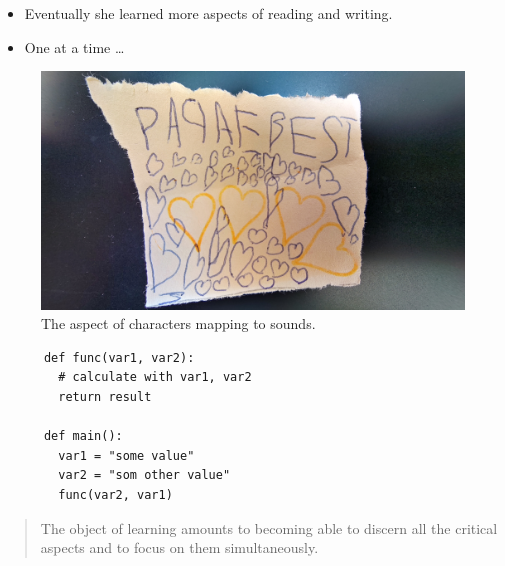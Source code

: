 \begin{frame}
  \begin{remark}
    \begin{itemize}
      \item Eventually she learned more aspects of reading and writing.
      \item One at a time \dots
    \end{itemize}
  \end{remark}

  \begin{figure}
    \includegraphics[height=0.5\textheight]{fig/papaebest.jpg}
    \caption{The aspect of characters mapping to sounds.}
  \end{figure}
\end{frame}

\begin{frame}[fragile]
  \begin{example}[Programming]
    \begin{verbatim}
      def func(var1, var2):
        # calculate with var1, var2
        return result

      def main():
        var1 = "some value"
        var2 = "som other value"
        func(var2, var1)
    \end{verbatim}
  \end{example}
\end{frame}

\begin{frame}
  \blockcquote[p.~37]{NecessaryConditionsOfLearning}
  {%
    The object of learning \textelp{} amounts to becoming able to discern all 
    the critical aspects and to focus on them simultaneously.%
  }
\end{frame}

